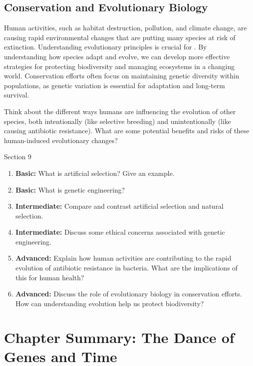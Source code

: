 \subsection{Conservation and Evolutionary Biology}

Human activities, such as habitat destruction, pollution, and climate change, are causing rapid environmental changes that are putting many species at risk of extinction.  Understanding evolutionary principles is crucial for .  By understanding how species adapt and evolve, we can develop more effective strategies for protecting biodiversity and managing ecosystems in a changing world.  Conservation efforts often focus on maintaining genetic diversity within populations, as genetic variation is essential for adaptation and long-term survival.

\begin{stopandthink}
Think about the different ways humans are influencing the evolution of other species, both intentionally (like selective breeding) and unintentionally (like causing antibiotic resistance). What are some potential benefits and risks of these human-induced evolutionary changes?
\end{stopandthink}


\begin{tieredquestions}{Section 9}

\begin{enumerate}
    \item \textbf{Basic:} What is artificial selection? Give an example.
    \item \textbf{Basic:} What is genetic engineering?
    \item \textbf{Intermediate:} Compare and contrast artificial selection and natural selection.
    \item \textbf{Intermediate:} Discuss some ethical concerns associated with genetic engineering.
    \item \textbf{Advanced:} Explain how human activities are contributing to the rapid evolution of antibiotic resistance in bacteria. What are the implications of this for human health?
    \item \textbf{Advanced:}  Discuss the role of evolutionary biology in conservation efforts. How can understanding evolution help us protect biodiversity?
\end{enumerate}

\end{tieredquestions}


\section{Chapter Summary: The Dance of Genes and Time}

